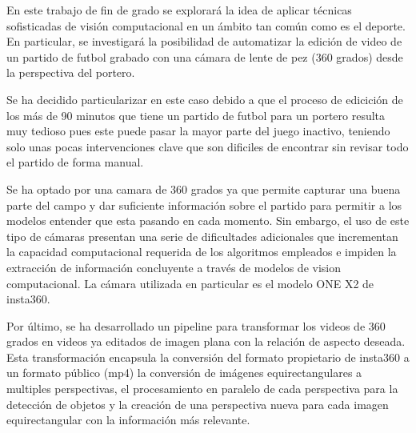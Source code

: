 En este trabajo de fin de grado se explorará la idea de aplicar técnicas sofisticadas de visión computacional en un ámbito tan común como es el deporte. En particular, se investigará la posibilidad de automatizar la edición de video de un partido de futbol grabado con una cámara de lente de pez (360 grados) desde la perspectiva del portero.

Se ha decidido particularizar en este caso debido a que el proceso de edicición de los más de 90 minutos que tiene un partido de futbol para un portero resulta muy tedioso pues este puede pasar la mayor parte del juego inactivo, teniendo solo unas pocas intervenciones clave que son dificiles de encontrar sin revisar todo el partido de forma manual.

Se ha optado por una camara de 360 grados ya que permite capturar una buena parte del campo y dar suficiente información sobre el partido para permitir a los modelos entender que esta pasando en cada momento. Sin embargo, el uso de este tipo de cámaras presentan una serie de dificultades adicionales que incrementan la capacidad computacional requerida de los algoritmos empleados e impiden la extracción de información concluyente a través de modelos de vision computacional. La cámara utilizada en particular es el modelo ONE X2 de insta360.

Por último, se ha desarrollado un pipeline para transformar los videos de 360 grados en videos ya editados de imagen plana con la relación de aspecto deseada. Esta transformación encapsula la conversión del formato propietario de insta360 a un formato público (mp4) la conversión de imágenes equirectangulares a multiples perspectivas, el procesamiento en paralelo de cada perspectiva para la detección de objetos y la creación de una perspectiva nueva para cada imagen equirectangular con la información más relevante.

